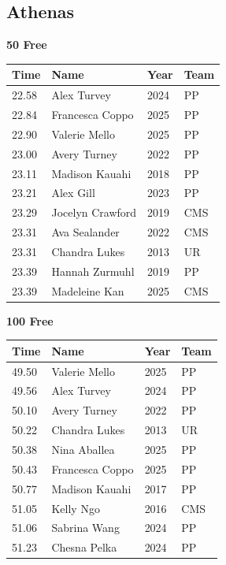 \subsection{Athenas}
\vspace{1.2em}
\noindent\begin{minipage}[t]{0.98\textwidth}
\centering
\textbf{\textcolor{teamprimary}{50 Free}}\par
\vspace{0.5em}
\centering
\small
\renewcommand{\arraystretch}{1.0}
\setlength{\tabcolsep}{4pt}
\begin{tabular}{@{}p{2.5cm}p{4.5cm}p{1.5cm}p{2.5cm}@{}}
\toprule
\textbf{Time} & \textbf{Name} & \textbf{Year} & \textbf{Team} \\
\midrule
22.58 & Alex Turvey & 2024 & PP \\
22.84 & Francesca Coppo & 2025 & PP \\
22.90 & Valerie Mello & 2025 & PP \\
23.00 & Avery Turney & 2022 & PP \\
23.11 & Madison Kauahi & 2018 & PP \\
23.21 & Alex Gill & 2023 & PP \\
23.29 & Jocelyn Crawford & 2019 & CMS \\
23.31 & Ava Sealander & 2022 & CMS \\
23.31 & Chandra Lukes & 2013 & UR \\
23.39 & Hannah Zurmuhl & 2019 & PP \\
23.39 & Madeleine Kan & 2025 & CMS \\
\bottomrule
\end{tabular}
\end{minipage}
\vspace{1.2em}
\noindent\begin{minipage}[t]{0.98\textwidth}
\centering
\textbf{\textcolor{teamprimary}{100 Free}}\par
\vspace{0.5em}
\centering
\small
\renewcommand{\arraystretch}{1.0}
\setlength{\tabcolsep}{4pt}
\begin{tabular}{@{}p{2.5cm}p{4.5cm}p{1.5cm}p{2.5cm}@{}}
\toprule
\textbf{Time} & \textbf{Name} & \textbf{Year} & \textbf{Team} \\
\midrule
49.50 & Valerie Mello & 2025 & PP \\
49.56 & Alex Turvey & 2024 & PP \\
50.10 & Avery Turney & 2022 & PP \\
50.22 & Chandra Lukes & 2013 & UR \\
50.38 & Nina Aballea & 2025 & PP \\
50.43 & Francesca Coppo & 2025 & PP \\
50.77 & Madison Kauahi & 2017 & PP \\
51.05 & Kelly Ngo & 2016 & CMS \\
51.06 & Sabrina Wang & 2024 & PP \\
51.23 & Chesna Pelka & 2024 & PP \\
\bottomrule
\end{tabular}
\end{minipage}
